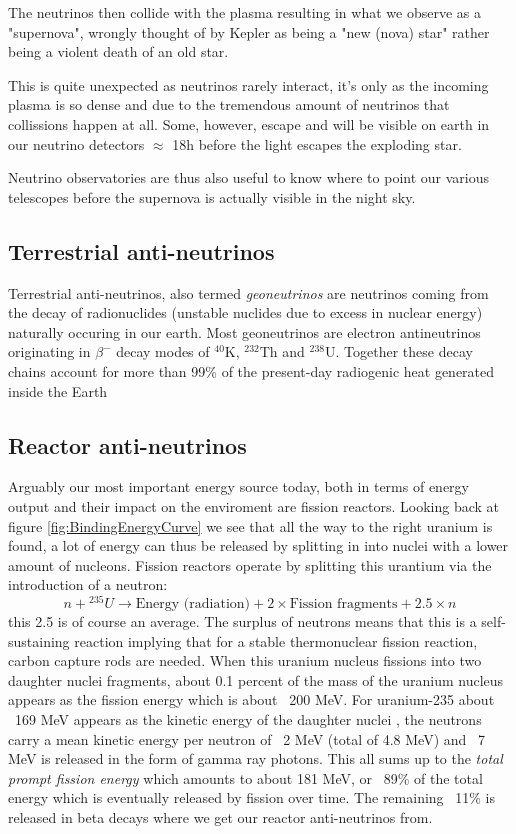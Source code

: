 \documentclass[11pt,a4paper,faculty=we,language=en,doctype=report]{cls/ugent-doc}
\begin{document}
The neutrinos then collide with the plasma resulting in what we observe as a
"supernova", wrongly thought of by Kepler as being a "new (nova) star" rather
being a violent death of an old star.

This is quite unexpected as neutrinos rarely interact, it's only as the
incoming plasma is so dense and due to the tremendous amount of neutrinos that
collissions happen at all. Some, however, escape and will be visible on earth
in our neutrino detectors $\approx$ 18h before the light escapes the exploding
star.

Neutrino observatories are thus also useful to know where to point our various
telescopes before the supernova is actually visible in the night sky.
\subsection{Terrestrial anti-neutrinos}
Terrestrial anti-neutrinos, also termed \textit{geoneutrinos} are neutrinos
coming from the decay of radionuclides (unstable nuclides due to excess in
nuclear energy) naturally occuring in our earth.  Most geoneutrinos are
electron antineutrinos originating in $\beta^-$ decay modes of ${}^{40}$K,
${}^{232}$Th and ${}^{238}$U. Together these decay chains account for more than
99\% of the present-day radiogenic heat generated inside the Earth

\subsection{Reactor anti-neutrinos}
Arguably our most important energy source today, both in terms of energy output
and their impact on the enviroment are fission reactors.  Looking back at
figure \ref{fig:BindingEnergyCurve} we see that all the way to the right
uranium is found, a lot of energy can thus be released by splitting in into
nuclei with a lower amount of nucleons.  Fission reactors operate by splitting
this urantium via the introduction of a neutron:
\begin{equation}
	n + {}^{235}U \rightarrow \text{Energy (radiation)} + 2\times\text{Fission fragments} + 2.5\times n
\end{equation}
this 2.5 is of course an average. The surplus of neutrons means that this is a
self-sustaining reaction implying that for a stable thermonuclear fission
reaction, carbon capture rods are needed.  When this uranium nucleus fissions
into two daughter nuclei fragments, about 0.1 percent of the mass of the
uranium nucleus appears as the fission energy which is about ~200 MeV. For
uranium-235 about ~169 MeV appears as the kinetic energy of the daughter nuclei
, the neutrons carry a mean kinetic energy per neutron of ~2 MeV (total of 4.8
MeV) and ~7 MeV is released in the form of gamma ray photons.  This all sums up
to the \textit{total prompt fission energy} which amounts to about 181 MeV, or
~89\% of the total energy which is eventually released by fission over time.
The remaining ~11\% is released in beta decays where we get our reactor
anti-neutrinos from.
\end{document}
